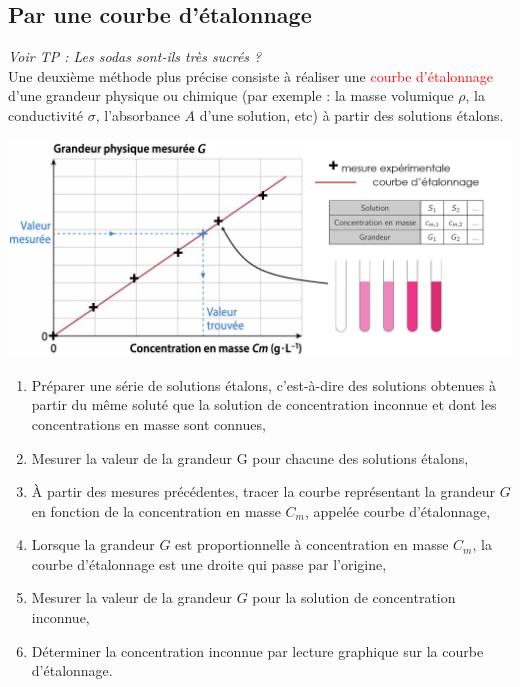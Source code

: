 \subsection{Par une courbe d'étalonnage}
\begin{Large}
\end{Large}\textit{Voir TP : Les sodas sont-ils très sucrés ?}\\
Une deuxième méthode plus précise consiste à réaliser une \textcolor{red}{courbe d'étalonnage} d'une grandeur physique ou chimique (par exemple : la masse volumique $\rho$, la conductivité $\sigma$, l'absorbance $A$ d'une solution, etc) à partir des solutions étalons.

\begin{center}
    \includegraphics[scale=0.6]{Images/Courbe_etalonnage.png}
\end{center}

\begin{tcolorbox}[colback=red!5!white,colframe=red!75!black,title=\textbf{Protocole expérimental pour réaliser une courbe d'étalonnage: }]
\begin{enumerate}
    \item Préparer une série de solutions étalons, c’est-à-dire des solutions obtenues à partir du même soluté que la solution de concentration inconnue et dont les concentrations en masse sont connues,
    \item Mesurer la valeur de la grandeur G pour chacune des solutions étalons,
    \item À partir des mesures précédentes, tracer la courbe représentant la grandeur $G$ en fonction de la concentration en masse $C_m$, appelée courbe d’étalonnage,
    \item Lorsque la grandeur $G$ est proportionnelle à concentration en masse $C_m$, la courbe d’étalonnage est une droite qui passe par l’origine,
    \item Mesurer la valeur de la grandeur $G$ pour la solution de concentration inconnue,
    \item Déterminer la concentration inconnue par lecture graphique sur la courbe d’étalonnage.
\end{enumerate}
\end{tcolorbox}